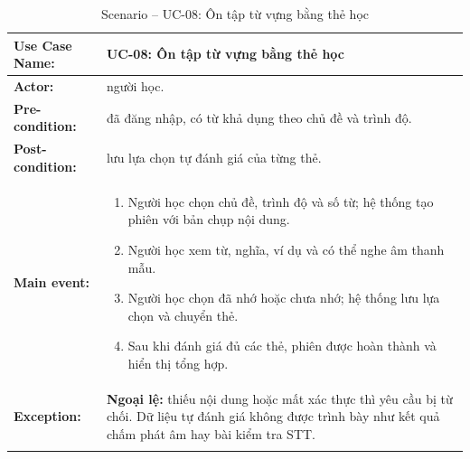 \documentclass[12pt,a4paper,oneside]{report}
\newenvironment{luongusecase}{%
    \begin{enumerate}[leftmargin=1.6em,topsep=0pt,itemsep=0.25em,parsep=0pt]
}{\end{enumerate}}
\begin{document}
\begingroup
\renewcommand{\arraystretch}{1.15}
\setlength{\LTpre}{0.4em}
\setlength{\LTpost}{0.6em}
\begin{longtable}{|>{\raggedright\arraybackslash\bfseries}p{}|p{}|}
\hline
Use Case Name: & UC-08: Ôn tập từ vựng bằng thẻ học \\
\hline
Actor: & người học. \\
\hline
Pre-condition: & đã đăng nhập, có từ khả dụng theo chủ đề và trình độ. \\
\hline
Post-condition: & lưu lựa chọn tự đánh giá của từng thẻ. \\
\hline
Main event: & \begin{luongusecase}
\item Người học chọn chủ đề, trình độ và số từ; hệ thống tạo phiên với bản chụp nội dung.
    \item Người học xem từ, nghĩa, ví dụ và có thể nghe âm thanh mẫu.
    \item Người học chọn đã nhớ hoặc chưa nhớ; hệ thống lưu lựa chọn và chuyển thẻ.
    \item Sau khi đánh giá đủ các thẻ, phiên được hoàn thành và hiển thị tổng hợp.
\end{luongusecase} \\
\hline
Exception: & \textbf{Ngoại lệ:} thiếu nội dung hoặc mất xác thực thì yêu cầu bị từ chối. Dữ liệu tự đánh giá không được trình bày như kết quả chấm phát âm hay bài kiểm tra STT. \\
\hline
\caption{Scenario -- UC-08: Ôn tập từ vựng bằng thẻ học}\label{tab:uc-08}\\
\end{longtable}
\endgroup
\end{document}
